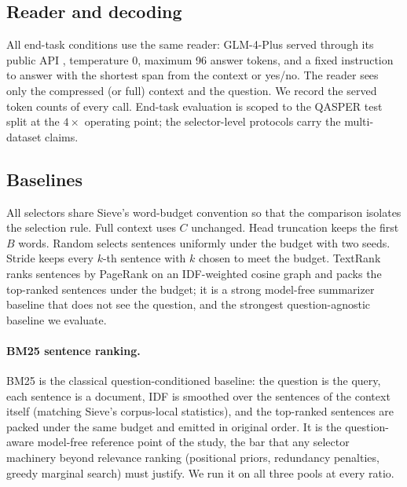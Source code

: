 \documentclass[preprint,12pt]{elsarticle}
\theoremstyle{remark}
\newcommand{\method}{Sieve}
\begin{document}
\subsection{Reader and decoding}
All end-task conditions use the same reader: GLM-4-Plus served through
its public API \citep{glm2024chatglm}, temperature $0$, maximum 96
answer tokens, and a fixed instruction to answer with the shortest
span from the context or yes/no. The reader sees only the compressed
(or full) context and the question. We record the served token counts
of every call. End-task evaluation is scoped to the QASPER test split
at the $4\times$ operating point; the selector-level protocols carry
the multi-dataset claims.

\subsection{Baselines}
\label{sec:baselines}
All selectors share \method{}'s word-budget convention so that the
comparison isolates the selection rule. Full context uses $C$
unchanged. Head truncation keeps the first $B$ words. Random selects
sentences uniformly under the budget with two seeds. Stride keeps
every $k$-th sentence with $k$ chosen to meet the budget. TextRank
\citep{mihalcea2004textrank} ranks sentences by PageRank on an
IDF-weighted cosine graph and packs the top-ranked sentences under the
budget; it is a strong model-free summarizer baseline that does not see
the question, and the strongest question-agnostic baseline we evaluate.

\paragraph{BM25 sentence ranking.}
BM25 \citep{robertson2009bm25} is the classical question-conditioned
baseline: the question is the query, each sentence is a document, IDF
is smoothed over the sentences of the context itself (matching
\method{}'s corpus-local statistics), and the top-ranked sentences are
packed under the same budget and emitted in original order. It is the
question-aware model-free reference point of the study, the bar that
any selector machinery beyond relevance ranking
(positional priors, redundancy penalties, greedy marginal search)
must justify. We run it on all three pools at every ratio.
\end{document}
